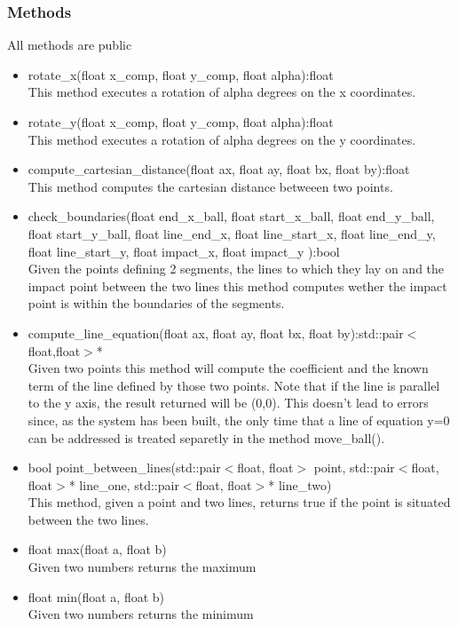 \documentclass[]{article}
\begin{document}
\subsubsection{Methods}
All methods are public
\begin{itemize}
	\item rotate\_x(float x\_comp, float y\_comp, float alpha):float \\This method executes a rotation of alpha degrees on the x coordinates.
	\item rotate\_y(float x\_comp, float y\_comp, float alpha):float\\This method executes a rotation of alpha degrees on the y coordinates.
	\item compute\_cartesian\_distance(float ax, float ay, float bx, float by):float\\This method computes the cartesian distance betweeen two points.
	\item check\_boundaries(float end\_x\_ball, float start\_x\_ball, float end\_y\_ball, float start\_y\_ball, float line\_end\_x, float line\_start\_x, float line\_end\_y, float line\_start\_y, float impact\_x, float impact\_y ):bool \\ Given the points defining 2 segments, the lines to which they lay on and the impact point between the two lines this method computes wether the impact point is within the boundaries of the segments. 
	\item compute\_line\_equation(float ax, float ay, float bx, float by):std::pair$<$float,float$>$*\\Given two points this method will compute the coefficient and the known term of the line defined by those two points. Note that if the line is parallel to the y axis, the result returned will be (0,0). This doesn't lead to errors since, as the system has been built, the only time that a line of equation y=0 can be addressed is treated separetly in the method move\_ball(). 
	\item bool point\_between\_lines(std::pair$<$float, float$>$ point, std::pair$<$float, float$>$* line\_one, std::pair$<$float, float$>$* line\_two)\\This method, given a point and two lines, returns true if the point is situated between the two lines.
    \item float max(float a, float b)\\Given two numbers returns the maximum
    \item float min(float a, float b)\\Given two numbers returns the minimum
\end{itemize}
\newpage
\end{document}
